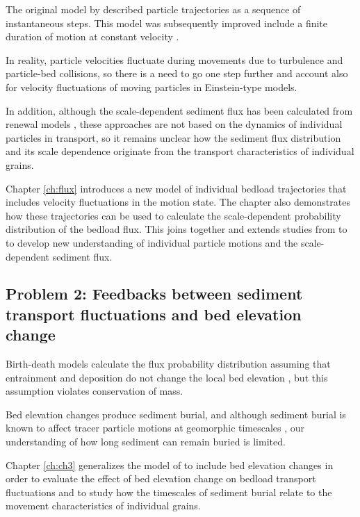 The original model by \citet{Einstein1937} described particle trajectories as a sequence of instantaneous steps. This model was subsequently improved include a finite duration of motion at constant velocity \citep{Lisle1998,Lajeunesse2017}.

In reality, particle velocities fluctuate during movements due to turbulence and particle-bed collisions, so there is a need to go one step further and account also for velocity fluctuations of moving particles in Einstein-type models.

In addition, although the scale-dependent sediment flux has been calculated from renewal models \citep{Turowski2010,Ancey2020}, these approaches are not based on the dynamics of individual particles in transport, so it remains unclear how the sediment flux distribution and its scale dependence originate from the transport characteristics of individual grains.

Chapter \ref{ch:flux} introduces a new model of individual bedload trajectories that includes velocity fluctuations in the motion state. The chapter also demonstrates how these trajectories can be used to calculate the scale-dependent probability distribution of the bedload flux.
This joins together and extends studies from \citet{Einstein1937} to \citet{Ancey2020b} to develop new understanding of individual particle motions and the scale-dependent sediment flux.

\subsection{Problem 2: Feedbacks between sediment transport fluctuations and bed elevation change}

Birth-death models calculate the flux probability distribution assuming that entrainment and deposition do not change the local bed elevation \citep{Heyman2013,Ancey2014}, but this assumption violates conservation of mass.

Bed elevation changes produce sediment burial, and although sediment burial is known to affect tracer particle motions at geomorphic timescales \citep{Ferguson2002,Hassan2017}, our understanding of how long sediment can remain buried is limited.

Chapter \ref{ch:ch3} generalizes the model of \citet{Ancey2008} to include bed elevation changes in order to evaluate the effect of bed elevation change on bedload transport fluctuations and to study how the timescales of sediment burial relate to the movement characteristics of individual grains.

